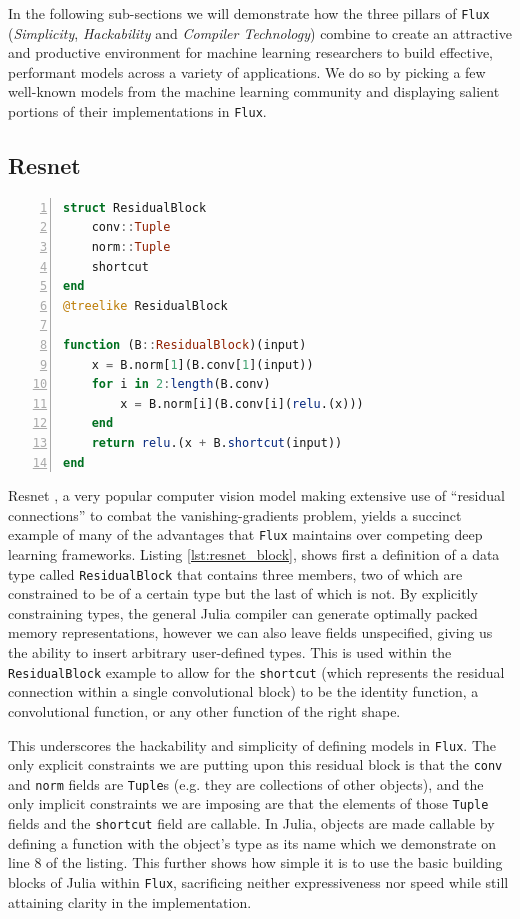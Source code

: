 \documentclass{juliacon}
\begin{document}
In the following sub-sections we will demonstrate how the three pillars of \texttt{Flux} (\textit{Simplicity}, \textit{Hackability} and \textit{Compiler Technology}) combine to create an attractive and productive environment for machine learning researchers to build effective, performant models across a variety of applications.  We do so by picking a few well-known models from the machine learning community and displaying salient portions of their implementations in \texttt{Flux}.

\subsection{Resnet}

\begin{lstlisting}[language = Julia,
                  label={lst:resnet_block},
                  caption={A resnet block in \texttt{Flux}},
                  captionpos=b,
                  numbers=left,]
struct ResidualBlock
    conv::Tuple
    norm::Tuple
    shortcut
end
@treelike ResidualBlock

function (B::ResidualBlock)(input)
    x = B.norm[1](B.conv[1](input))
    for i in 2:length(B.conv)
        x = B.norm[i](B.conv[i](relu.(x)))
    end
    return relu.(x + B.shortcut(input))
end
\end{lstlisting}

Resnet \cite{resnet}, a very popular computer vision model making extensive use of ``residual connections'' to combat the vanishing-gradients problem, yields a succinct example of many of the advantages that \texttt{Flux} maintains over competing deep learning frameworks.  Listing \ref{lst:resnet_block}, shows first a definition of a data type called \texttt{ResidualBlock} that contains three members, two of which are constrained to be of a certain type but the last of which is not.  By explicitly constraining types, the general Julia compiler can generate optimally packed memory representations, however we can also leave fields unspecified, giving us the ability to insert arbitrary user-defined types.  This is used within the \texttt{ResidualBlock} example to allow for the \texttt{shortcut} (which represents the residual connection within a single convolutional block) to be the identity function, a convolutional function, or any other function of the right shape.

This underscores the hackability and simplicity of defining models in \texttt{Flux}.  The only explicit constraints we are putting upon this residual block is that the \texttt{conv} and \texttt{norm} fields are \texttt{Tuple}s (e.g. they are collections of other objects), and the only implicit constraints we are imposing are that the elements of those \texttt{Tuple} fields and the \texttt{shortcut} field are callable.  In Julia, objects are made callable by defining a function with the object's type as its name which we demonstrate on line 8 of the listing.  This further shows how simple it is to use the basic building blocks of Julia within \texttt{Flux}, sacrificing neither expressiveness nor speed while still attaining clarity in the implementation.
\end{document}
